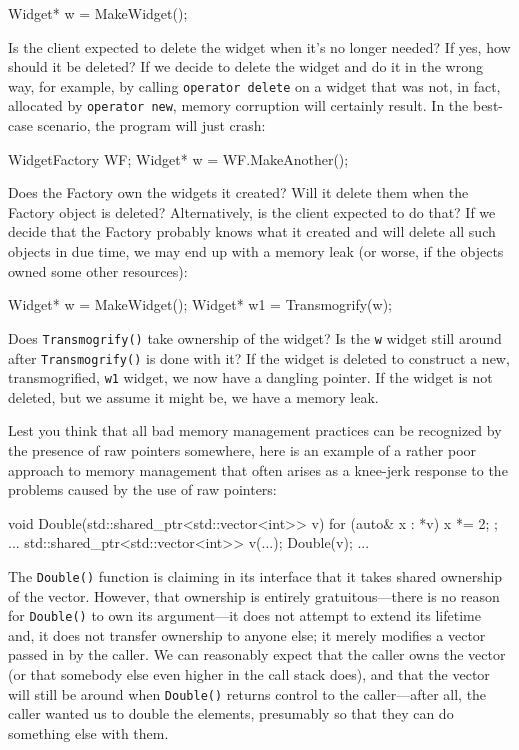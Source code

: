 \begin{code}
Widget* w = MakeWidget();
\end{code}

Is the client expected to delete the widget when it's no longer needed? If yes, how should it be deleted? If we decide to delete the widget and do it in the wrong way, for example, by calling \texttt{operator\ delete} on a widget that was not, in fact, allocated by \texttt{operator\ new}, memory corruption will certainly result. In the best-case scenario, the program will just crash:

\begin{code}
WidgetFactory WF;
Widget* w = WF.MakeAnother();
\end{code}

Does the Factory own the widgets it created? Will it delete them when the Factory object is deleted? Alternatively, is the client expected to do that? If we decide that the Factory probably knows what it created and will delete all such objects in due time, we may end up with a memory leak (or worse, if the objects owned some other resources):

\begin{code}
Widget* w = MakeWidget();
Widget* w1 = Transmogrify(w);
\end{code}

Does \texttt{Transmogrify()} take ownership of the widget? Is the \texttt{w} widget still around after \texttt{Transmogrify()} is done with it? If the widget is deleted to construct a new, transmogrified, \texttt{w1} widget, we now have a dangling pointer. If the widget is not deleted, but we assume it might be, we have a memory leak.

Lest you think that all bad memory management practices can be recognized by the presence of raw pointers somewhere, here is an example of a rather poor approach to memory management that often arises as a knee-jerk response to the problems caused by the use of raw pointers:

\begin{code}
void Double(std::shared_ptr<std::vector<int>> v) {
  for (auto& x : *v) {
    x *= 2;
  }
};
...
std::shared_ptr<std::vector<int>> v(...);
Double(v);
...
\end{code}

The \texttt{Double()} function is claiming in its interface that it takes shared ownership of the vector. However, that ownership is entirely gratuitous---there is no reason for \texttt{Double()} to own its argument---it does not attempt to extend its lifetime and, it does not transfer ownership to anyone else; it merely modifies a vector passed in by the caller. We can reasonably expect that the caller owns the vector (or that somebody else even higher in the call stack does), and that the vector will still be around when \texttt{Double()} returns control to the caller---after all, the caller wanted us to double the elements, presumably so that they can do something else with them.

